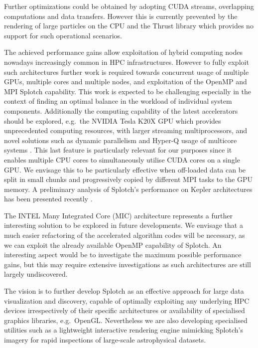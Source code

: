 \documentclass[smallextended]{svjour3}
\begin{document}
Further optimizations could be obtained by adopting CUDA streams, overlapping computations and data transfers. However this is currently prevented by the rendering of large particles on the CPU and the Thrust library which provides no support for such operational scenarios.

The achieved performance gains allow exploitation of hybrid computing nodes nowadays increasingly common in HPC infrastructures. However to fully exploit such architectures further work is required towards concurrent usage of multiple GPUs, multiple cores and multiple nodes, and exploitation of the OpenMP and MPI Splotch capability. This work is expected to be challenging especially in the context of finding an optimal balance in the workload of individual system components. Additionally the computing capability of the latest accelerators should be explored, e.g.\ the NVIDIA Tesla K20X GPU which provides unprecedented computing resources, with larger streaming multiprocessors, and novel solutions such as dynamic parallelism and Hyper-Q usage of multicore systems \cite{GK110}. This last feature is particularly relevant for our purposes since it enables
multiple CPU cores to simultaneously utilise CUDA cores on a single GPU. We envisage this to be particularly effective when off-loaded data can be split in small chunks and progressively copied by different MPI tasks 
to the GPU memory. A preliminary analysis of Splotch's performance on Kepler architectures has been presented recently \cite{GPUTech}. 

The INTEL Many Integrated Core (MIC) architecture \cite{mic} represents a further interesting solution to be explored in future developments. We envisage that a much easier refactoring of the accelerated algorithm codes will be necessary, as we can exploit the already available OpenMP capability of Splotch. An interesting aspect would be to investigate the maximum possible performance gains, but this may require extensive investigations as such architectures are still largely undiscovered.

The vision is to further develop Splotch as an effective approach for large data visualization and discovery, capable of optimally exploiting any underlying HPC devices irrespectively of their specific architectures or availability of specialised graphics libraries, e.g.\ OpenGL. Nevertheless we are also developing specialised utilities such as a lightweight interactive rendering engine mimicking Splotch's imagery for rapid inspections of large-scale astrophysical datasets.


	
\end{document}
